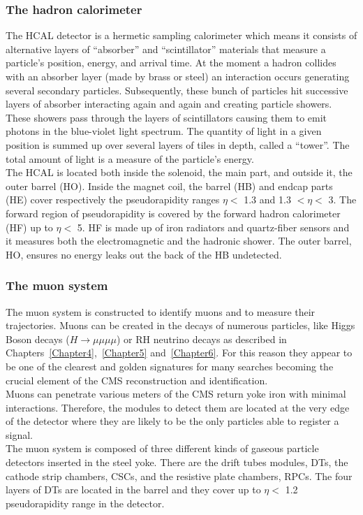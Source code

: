 \subsubsection{The hadron calorimeter}
The HCAL detector is a hermetic sampling calorimeter which means it
consists of alternative layers of ``absorber'' and ``scintillator''
materials that measure a particle’s position, energy, and arrival time.
At the moment a hadron collides with an absorber layer (made by brass or steel) an interaction occurs generating several secondary
particles. Subsequently, these bunch of particles hit successive layers
of absorber interacting again and again and creating particle showers.
These showers pass through the layers of scintillators
causing them to emit photons in the blue-violet light spectrum.
The quantity of light in a given position is summed up over several
layers of tiles in depth, called a “tower”. The total amount of
light is a measure of the particle’s energy.\\
The HCAL is located both inside the solenoid, the main part, and
outside it, the outer barrel (HO). 
Inside the magnet coil, the barrel (HB) and endcap parts (HE) cover
respectively the pseudorapidity
ranges $\eta<$ 1.3 and 1.3 $<\eta<$ 3.
The forward region of pseudorapidity is covered by the forward hadron
calorimeter (HF) up to $\eta<$ 5. HF is made up of iron radiators and
quartz-fiber sensors and it measures both the electromagnetic and the hadronic shower. 
The outer barrel, HO, ensures no energy leaks out the
back of the HB undetected.

\subsubsection{The muon system}\label{sec:muonsystem}
The muon system is constructed to identify muons and to measure their
trajectories. Muons can be created in the decays of numerous particles,
like Higgs Boson decays ($H \rightarrow \mu \mu \mu \mu$) or 
RH neutrino decays as described in
Chapters~\ref{Chapter4},~\ref{Chapter5} and~\ref{Chapter6}. For this
reason they
appear to be one of the clearest and golden signatures for many
searches becoming the crucial element of the CMS reconstruction
and identification.\\
Muons can penetrate various meters of the CMS return yoke iron with
minimal interactions. Therefore, the modules to detect them are located at
the very edge of the detector where they are likely to be the only particles
able to register a signal.\\
The muon system is composed of three different kinds of gaseous particle
detectors inserted in the steel yoke. 
There are the drift tubes
modules, DTs, the cathode strip chambers, CSCs, and the resistive plate
chambers, RPCs.
The four layers of DTs are located in the barrel and they cover up to
$\eta<$ 1.2 pseudorapidity range in the detector. 

